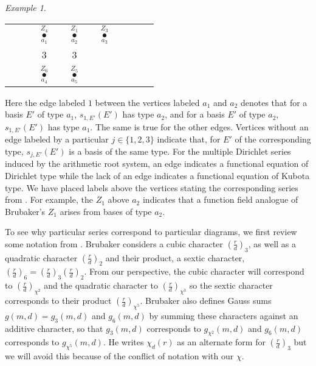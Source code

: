 \documentclass[11pt,letterpaper]{article}
\theoremstyle{definition}
\theoremstyle{remark}
\newtheorem{example}[theorem]{Example}
\numberwithin{equation}{section}
\theoremstyle{dotless}
\begin{document}
\begin{example}
\begin{center}
	\begin{tabular}{c c c c c c c c c c c c}
		&&
		& $\overset{Z_4}{\underset{a_1}{\bullet}}$
		& \hspace{-5pt}\raisebox{3pt}{$\overset{1}{\rule{40pt}{0.5pt}}$}\hspace{-5pt}
		& $\overset{Z_1}{ \underset{a_2}{\bullet}}$
		& \hspace{-5pt}\raisebox{3pt}{$\overset{2}{\rule{40pt}{0.5pt}}$}\hspace{-5pt}
		& $\overset{Z_3} {\underset{a_3}{\bullet}}$ & &
		\\
		&& & {\scriptsize 3} \vline\hspace{5pt} & & {\scriptsize 3} \vline\hspace{5pt} & & &&
		\\
		&& &  $\overset{Z_6} {\underset{a_4}{\bullet}}$
		&\hspace{-5pt}\raisebox{3pt}{$\overset{1}{\rule{40pt}{0.5pt}}$}\hspace{-5pt}
		& $\overset{Z_5}{\underset{a_5}{\bullet}}$
		& & & &
	\end{tabular}
\end{center}

Here the edge labeled $1$ between the vertices labeled $a_1$ and $a_2$ denotes that for a basis $E'$ of type $a_1$, $s_{1,E'}(E') $ has type $a_2$, and for a basis $E'$ of type $a_2$, $s_{1,E'}(E') $ has type $a_1$. The same is true for the other edges. Vertices without an edge labeled by a particular $j \in \{1,2,3\}$ indicate that, for $E'$ of the corresponding type, $s_{j,E'}(E')$ is a basis of the same type. For the multiple Dirichlet series induced by the arithmetic root system, an edge indicates a functional equation of Dirichlet type while the lack of an edge indicates a functional equation of Kubota type. We have placed labels above the vertices stating the corresponding series from \cite{BrubakerThesis}. For example, the $Z_1$ above $a_2$ indicates that a function field analogue of Brubaker's $Z_1$ arises from bases of type $a_2$.   

To see why particular series correspond to particular diagrams, we first review some notation from \cite[\S2.1]{BrubakerThesis}. Brubaker considers a cubic character $\left(\frac{r}{d} \right)_3$, as well as a quadratic character $\left(\frac{r}{d} \right)_2$ and their product, a sextic character, $\left(\frac{r}{d} \right)_6=\left(\frac{r}{d} \right)_3\left(\frac{r}{d} \right)_2$. From our perspective, the cubic character will correspond to $\left(\frac{r}{d} \right)_{\chi^2}$ and the quadratic character to $\left(\frac{r}{d} \right)_{\chi^3}$ so the sextic character corresponds to their product $\left(\frac{r}{d} \right)_{\chi^5}$. Brubaker also defines Gauss sums $g(m,d)= g_3(m,d)$ and $g_6(m,d)$ by summing these characters against an additive character, so that $g_3(m,d)$ corresponds to $g_{\chi^2}(m,d)$ and $g_6(m,d)$ corresponds to $g_{\chi^5}(m,d)$.  He writes $\chi_d(r)$ as an alternate form for $\left(\frac{r}{d} \right)_3$ but we will avoid this because of the conflict of notation with our $\chi$.


\end{example}
\end{document}
